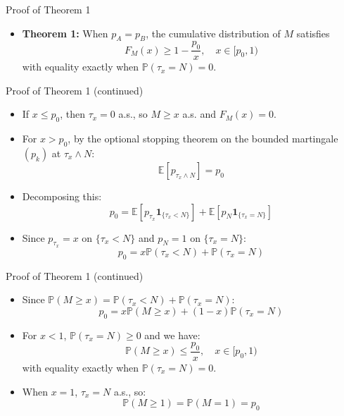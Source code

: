 \documentclass{beamer}
\renewcommand{\P}{\mathbb{P}}
\newcommand{\E}{\mathbb{E}}
\begin{document}
\appendix

\begin{frame}{Proof of Theorem 1}
\begin{itemize}
  \item \textbf{Theorem 1:} When $p_A = p_B$, the cumulative distribution of $M$ satisfies 
  \begin{equation*}
    F_M(x) \geq 1 - \frac{p_0}{x}, \quad x \in [p_0, 1)
  \end{equation*}
  with equality exactly when $\P(\tau_x = N) = 0$.
\end{itemize}
\end{frame}

\begin{frame}{Proof of Theorem 1 (continued)}
\begin{itemize}
  \item If $x \leq p_0$, then $\tau_x = 0$ a.s., so $M \geq x$ a.s. and $F_M(x) = 0$.
  \item For $x > p_0$, by the optional stopping theorem on the bounded martingale $(p_k)$ at $\tau_x \wedge N$:
  \begin{equation*}
    \E[p_{\tau_x \wedge N}] = p_0
  \end{equation*}
  \item Decomposing this:
  \begin{equation*}
    p_0 = \E[p_{\tau_x} \boldsymbol{1}_{\{\tau_x < N\}}] + \E[p_N \boldsymbol{1}_{\{\tau_x = N\}}]
  \end{equation*}
  \item Since $p_{\tau_x} = x$ on $\{\tau_x < N\}$ and $p_N = 1$ on $\{\tau_x = N\}$:
  \begin{equation*}
    p_0 = x \P(\tau_x < N) + \P(\tau_x = N)
  \end{equation*}
\end{itemize}
\end{frame}

\begin{frame}{Proof of Theorem 1 (continued)}
\begin{itemize}
  \item Since $\P(M \geq x) = \P(\tau_x < N) + \P(\tau_x = N)$:
  \begin{equation*}
    p_0 = x \P(M \geq x) + (1 - x)\P(\tau_x = N)
  \end{equation*}
  \item For $x < 1$, $\P(\tau_x = N) \geq 0$ and we have:
  \begin{equation*}
    \P(M \geq x) \leq \frac{p_0}{x}, \quad x \in [p_0, 1)
  \end{equation*}
  with equality exactly when $\P(\tau_x=N)=0$.
  \item When $x = 1$, $\tau_x = N$ a.s., so:
  \begin{equation*}
    \P(M \geq 1) = \P(M = 1) = p_0
  \end{equation*}
\end{itemize}
\end{frame}
\end{document}
